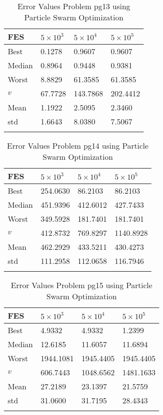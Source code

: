 \documentclass[10pt, a4paper]{book}
\begin{document}
\begin{center}
\begin{longtable}{l l l l}
FES & $5 \times 10^{3}$ & $5 \times 10^{4}$ & $5 \times 10^{5}$ \\
\hline
Best & 0.1278 & 0.9607 & 0.9607 \\
Median & 0.8964 & 0.9448 & 0.9381 \\
Worst & 8.8829 & 61.3585 & 61.3585 \\
$v$ & 67.7728 & 143.7868 & 202.4412 \\
Mean & 1.1922 & 2.5095 & 2.3460 \\
std & 1.6643 & 8.0380 & 7.5067 \\
\caption{ Error Values Problem pg13 using Particle Swarm Optimization }
\end{longtable}
\end{center}

\begin{center}
\begin{longtable}{l l l l}
FES & $5 \times 10^{3}$ & $5 \times 10^{4}$ & $5 \times 10^{5}$ \\
\hline
Best & 254.0630 & 86.2103 & 86.2103 \\
Median & 451.9396 & 412.6012 & 427.7433 \\
Worst & 349.5928 & 181.7401 & 181.7401 \\
$v$ & 412.8732 & 769.8297 & 1140.8928 \\
Mean & 462.2929 & 433.5211 & 430.4273 \\
std & 111.2958 & 112.0658 & 116.7946 \\
\caption{ Error Values Problem pg14 using Particle Swarm Optimization }
\end{longtable}
\end{center}

\begin{center}
\begin{longtable}{l l l l}
FES & $5 \times 10^{3}$ & $5 \times 10^{4}$ & $5 \times 10^{5}$ \\
\hline
Best & 4.9332 & 4.9332 & 1.2399 \\
Median & 12.6185 & 11.6057 & 11.6894 \\
Worst & 1944.1081 & 1945.4405 & 1945.4405 \\
$v$ & 606.7443 & 1048.6562 & 1481.1633 \\
Mean & 27.2189 & 23.1397 & 21.5759 \\
std & 31.0600 & 31.7195 & 28.4343 \\
\caption{ Error Values Problem pg15 using Particle Swarm Optimization }
\end{longtable}
\end{center}
\end{document}
